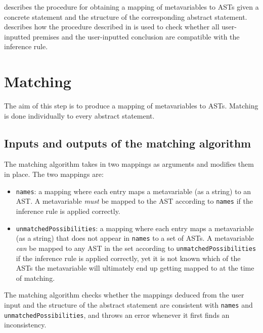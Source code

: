  describes the procedure for obtaining a mapping of metavariables to ASTs given a concrete statement and the structure of the corresponding abstract statement.  describes how the procedure described in  is used to check whether all user-inputted premises and the user-inputted conclusion are compatible with the inference rule.

\section{Matching}
\label{checking:matching}
The aim of this step is to produce a mapping of metavariables to ASTs. Matching is done individually to every abstract statement.

\subsection{Inputs and outputs of the matching algorithm}
The matching algorithm takes in two mappings as arguments and modifies them in place. The two mappings are:
\begin{itemize}
    \item \lstinline{names}: a mapping where each entry maps a metavariable (as a string) to an AST. A metavariable \textit{must} be mapped to the AST according to \lstinline{names} if the inference rule is applied correctly.
    \item \lstinline{unmatchedPossibilities}: a mapping where each entry maps a metavariable (as a string) that does not appear in \lstinline{names} to a set of ASTs. A metavariable \textit{can} be mapped to any AST in the set according to \lstinline{unmatchedPossibilities} if the inference rule is applied correctly, yet it is not known which of the ASTs the metavariable will ultimately end up getting mapped to at the time of matching.
\end{itemize}
The matching algorithm checks whether the mappings deduced from the user input and the structure of the abstract statement are consistent with \lstinline{names} and \lstinline{unmatchedPossibilities}, and throws an error whenever it first finds an inconsistency.

